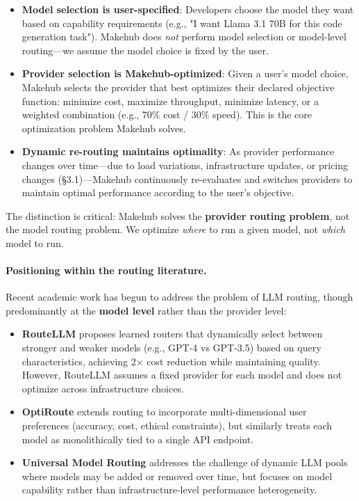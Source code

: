 \documentclass[english]{article}
\begin{document}
\begin{itemize}
    \item \textbf{Model selection is user-specified}: Developers choose the model they want based on capability requirements (e.g., "I want Llama 3.1 70B for this code generation task"). Makehub does \emph{not} perform model selection or model-level routing—we assume the model choice is fixed by the user.

    \item \textbf{Provider selection is Makehub-optimized}: Given a user's model choice, Makehub selects the provider that best optimizes their declared objective function: minimize cost, maximize throughput, minimize latency, or a weighted combination (e.g., 70\% cost / 30\% speed). This is the core optimization problem Makehub solves.

    \item \textbf{Dynamic re-routing maintains optimality}: As provider performance changes over time—due to load variations, infrastructure updates, or pricing changes (§3.1)—Makehub continuously re-evaluates and switches providers to maintain optimal performance according to the user's objective.
\end{itemize}

The distinction is critical: Makehub solves the \textbf{provider routing problem}, not the model routing problem. We optimize \emph{where} to run a given model, not \emph{which} model to run.

\paragraph{Positioning within the routing literature.}

Recent academic work has begun to address the problem of LLM routing, though predominantly at the \textbf{model level} rather than the provider level:

\begin{itemize}
    \item \textbf{RouteLLM} \parencite{ong2024routellm} proposes learned routers that dynamically select between stronger and weaker models (e.g., GPT-4 vs GPT-3.5) based on query characteristics, achieving 2× cost reduction while maintaining quality. However, RouteLLM assumes a fixed provider for each model and does not optimize across infrastructure choices.

    \item \textbf{OptiRoute} \parencite{kumar2025dynamic} extends routing to incorporate multi-dimensional user preferences (accuracy, cost, ethical constraints), but similarly treats each model as monolithically tied to a single API endpoint.

    \item \textbf{Universal Model Routing} \parencite{zhao2025universal} addresses the challenge of dynamic LLM pools where models may be added or removed over time, but focuses on model capability rather than infrastructure-level performance heterogeneity.
\end{itemize}
\end{document}
